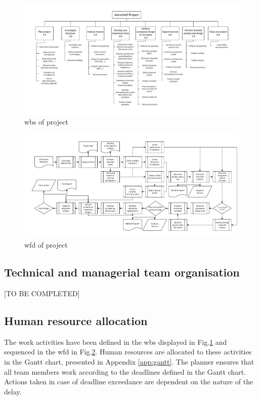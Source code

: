 \begin{figure}
    \includegraphics[scale=0.85]{Figure/WBS_MTR.pdf}
    \caption{\acrfull{wbs} of project}
    \label{fig:wbs}
\end{figure}
\begin{figure}
    \includegraphics[scale=0.85]{Figure/WFD_MTR.pdf}
    \caption{\acrfull{wfd} of project}
    \label{fig:wfd}
\end{figure}

\subsection{Technical and managerial team organisation}
\label{sec:org}
[TO BE COMPLETED]

\subsection{Human resource allocation}
\label{sec:gantt}
The work activities have been defined in the \gls{wbs} displayed in Fig.\ref{fig:wbs} and sequenced in the \gls{wfd} in Fig.\ref{fig:wfd}. Human resources are allocated to these activities in the Gantt chart, presented in Appendix \ref{app:gantt}. The planner ensures that all team members work according to the deadlines defined in the Gantt chart. Actions taken in case of deadline exceedance are dependent on the nature of the delay.
